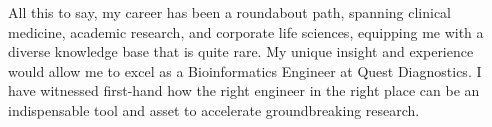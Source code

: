 



All this to say, my career has been a roundabout path, spanning clinical medicine, academic research, and corporate life sciences, equipping me with a diverse knowledge base that is quite rare. My unique insight and experience would allow me to excel as a Bioinformatics Engineer at Quest Diagnostics. I have witnessed first-hand how the right engineer in the right place can be an indispensable tool and asset to accelerate groundbreaking research.